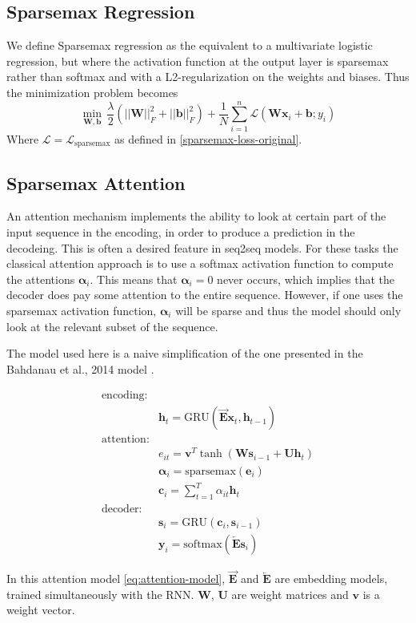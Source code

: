 \subsection{Sparsemax Regression}
We define Sparsemax regression as the equivalent to a multivariate logistic regression, but where the activation function at the output layer is sparsemax rather than softmax and with a L2-regularization on the weights and biases. Thus the minimization problem becomes
\begin{equation}
\min_{\mathbf{W},\mathbf{b}} \, \frac{\lambda}{2} (||\mathbf{W}||^2_{F} + ||\mathbf{b}||^2_{F}) + \frac{1}{N} \sum\limits_{i=1}^n \mathcal{L} (\mathbf{W} \mathbf{x}_i + \mathbf{b}; y_i)
\label{sparsemax-regression}
\end{equation}
Where $\mathcal{L} = \mathcal{L}_{\mathrm{sparsemax}}$ as defined in \eqref{sparsemax-loss-original}.

\subsection{Sparsemax Attention}
An attention mechanism implements the ability to look at certain part of the input sequence in the encoding, in order to produce a prediction in the decodeing. This is often a desired feature in seq2seq models. For these tasks the classical attention approach is to use a softmax activation function to compute the attentions ${\boldsymbol\alpha}_i$. This means that ${\boldsymbol\alpha}_i=0$ never occurs, which implies that the decoder does pay some attention to the entire sequence. However, if one uses the sparsemax activation function, ${\boldsymbol\alpha}_i$ will be sparse and thus the model should only look at the relevant subset of the sequence.

The model used here is a naive simplification of the one presented in the Bahdanau et al., 2014 model \cite{attention}.

\begin{equation}
\begin{aligned}
\text{encoding:} & \\
& \mathbf{h}_t = \mathrm{GRU}(\overrightarrow{\mathbf{E}} \mathbf{x}_t, \mathbf{h}_{t-1}) \\
\text{attention:} & \\
& e_{it} = \mathbf{v}^T \tanh(\mathbf{W} \mathbf{s}_{i-1} + \mathbf{U} \mathbf{h}_t) \\
& {\boldsymbol\alpha}_i = \mathrm{sparsemax}(\mathbf{e}_i) \\
& \mathbf{c}_i = {\textstyle \sum_{t=1}^T} \alpha_{it} \mathbf{h}_t \\
\text{decoder:} & \\
&\mathbf{s}_i = \mathrm{GRU}(\mathbf{c}_i, \mathbf{s}_{i-1}) \\
&\mathbf{y}_i = \mathrm{softmax}(\overleftarrow{\mathbf{E}} \mathbf{s}_i)
\end{aligned}
\label{eq:attention-model}
\end{equation}

In this attention model \eqref{eq:attention-model}, $\overrightarrow{\mathbf{E}}$ and $\overleftarrow{\mathbf{E}}$ are embedding models, trained simultaneously with the RNN. $\mathbf{W}$, $\mathbf{U}$ are weight matrices and $\mathbf{v}$ is a weight vector.
